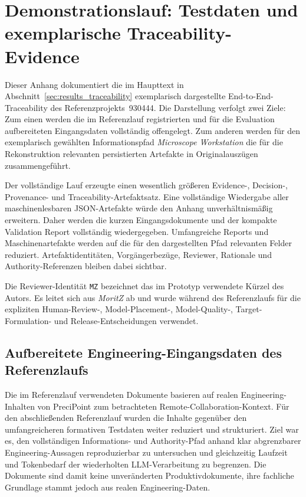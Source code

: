 \section[Demonstrationslauf: exemplarische Traceability]{Demonstrationslauf: Testdaten und exemplarische Traceability-Evidence}

Dieser Anhang dokumentiert die im Haupttext in
Abschnitt~\ref{sec:results_traceability} exemplarisch dargestellte
End-to-End-Traceability des Referenzprojekts~930444. Die Darstellung verfolgt
zwei Ziele: Zum einen werden die im Referenzlauf registrierten und für die
Evaluation aufbereiteten Eingangsdaten vollständig offengelegt. Zum anderen
werden für den exemplarisch gewählten Informationspfad
\emph{Microscope Workstation} die für die Rekonstruktion relevanten
persistierten Artefakte in Originalauszügen zusammengeführt.

Der vollständige Lauf erzeugte einen wesentlich größeren Evidence-, Decision-,
Provenance- und Traceability-Artefaktsatz. Eine vollständige Wiedergabe aller
maschinenlesbaren JSON-Artefakte würde den Anhang unverhältnismäßig erweitern.
Daher werden die kurzen Eingangsdokumente und der kompakte Validation Report
vollständig wiedergegeben. Umfangreiche Reports und Maschinenartefakte werden auf die für
den dargestellten Pfad relevanten Felder reduziert. Artefaktidentitäten,
Vorgängerbezüge, Reviewer, Rationale und Authority-Referenzen bleiben dabei
sichtbar.

Die Reviewer-Identität \texttt{MZ} bezeichnet das im Prototyp verwendete
Kürzel des Autors. Es leitet sich aus \emph{MoritZ} ab und wurde während des
Referenzlaufs für die expliziten Human-Review-, Model-Placement-,
Model-Quality-, Target-Formulation- und Release-Entscheidungen verwendet.

\subsection{Aufbereitete Engineering-Eingangsdaten des Referenzlaufs}
\label{app:traceability_930444_inputs}

Die im Referenzlauf verwendeten Dokumente basieren auf realen
Engineering-Inhalten von PreciPoint zum betrachteten
Remote-Collaboration-Kontext. Für den abschließenden Referenzlauf wurden die
Inhalte gegenüber den umfangreicheren formativen Testdaten weiter reduziert
und strukturiert. Ziel war es, den vollständigen Informations- und
Authority-Pfad anhand klar abgrenzbarer Engineering-Aussagen reproduzierbar
zu untersuchen und gleichzeitig Laufzeit und Tokenbedarf der wiederholten
LLM-Verarbeitung zu begrenzen. Die Dokumente sind damit keine unveränderten
Produktivdokumente, ihre fachliche Grundlage stammt jedoch aus realen
Engineering-Daten.

